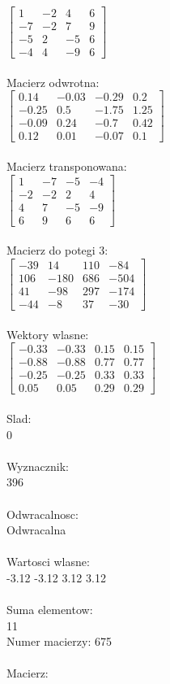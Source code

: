 \documentclass[a4paper,12pt]{article}
\begin{document}
$\begin{bmatrix} 1&-2&4&6\\-7&-2&7&9\\-5&2&-5&6\\-4&4&-9&6 \end{bmatrix}$
\\
\\
Macierz odwrotna:\\

$\begin{bmatrix} 0.14&-0.03&-0.29&0.2\\-0.25&0.5&-1.75&1.25\\-0.09&0.24&-0.7&0.42\\0.12&0.01&-0.07&0.1 \end{bmatrix}$
\\
\\
Macierz transponowana:\\

$\begin{bmatrix} 1&-7&-5&-4\\-2&-2&2&4\\4&7&-5&-9\\6&9&6&6 \end{bmatrix}$
\\
\\
Macierz do potegi 3:\\

$\begin{bmatrix} -39&14&110&-84\\106&-180&686&-504\\41&-98&297&-174\\-44&-8&37&-30 \end{bmatrix}$
\\
\\
Wektory wlasne:\\

$\begin{bmatrix} -0.33&-0.33&0.15&0.15\\-0.88&-0.88&0.77&0.77\\-0.25&-0.25&0.33&0.33\\0.05&0.05&0.29&0.29 \end{bmatrix}$
\\
\\
Slad:\\
0
\\
\\
Wyznacznik:\\
396
\\
\\
Odwracalnosc:\\
Odwracalna
\\
\\
Wartosci wlasne:\\
-3.12 -3.12 3.12 3.12
\\
\\
Suma elementow:\\
11
\\
\newpage
Numer macierzy:
675
\\
\\
Macierz:\\
\end{document}
